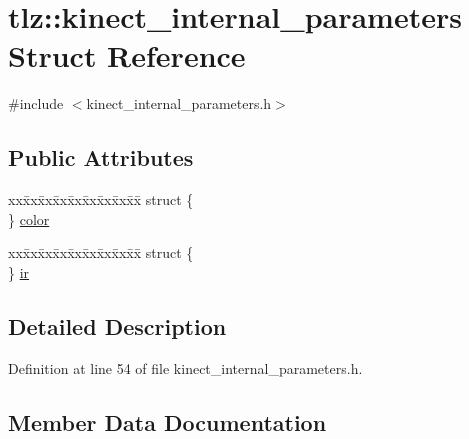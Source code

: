 \hypertarget{structtlz_1_1kinect__internal__parameters}{}\section{tlz\+:\+:kinect\+\_\+internal\+\_\+parameters Struct Reference}
\label{structtlz_1_1kinect__internal__parameters}


{\ttfamily \#include $<$kinect\+\_\+internal\+\_\+parameters.\+h$>$}

\subsection*{Public Attributes}
\begin{DoxyCompactItemize}
\item 
\begin{tabbing}
xx\=xx\=xx\=xx\=xx\=xx\=xx\=xx\=xx\=\kill
struct \{\\
\} \hyperlink{structtlz_1_1kinect__internal__parameters_a2c38ef1e11008eb5244bca830ccb6494}{color}\\

\end{tabbing}\item 
\begin{tabbing}
xx\=xx\=xx\=xx\=xx\=xx\=xx\=xx\=xx\=\kill
struct \{\\
\} \hyperlink{structtlz_1_1kinect__internal__parameters_a3005aa9c7e136dd9149305563d210d02}{ir}\\

\end{tabbing}\end{DoxyCompactItemize}


\subsection{Detailed Description}


Definition at line 54 of file kinect\+\_\+internal\+\_\+parameters.\+h.



\subsection{Member Data Documentation}
